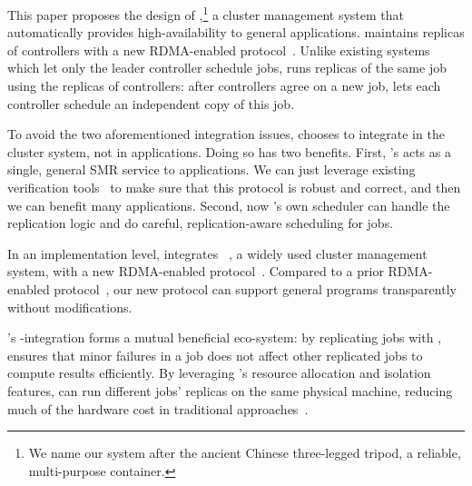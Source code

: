 
This paper proposes the design of \xxx,\footnote{We name our system after the 
ancient Chinese three-legged tripod, a reliable, multi-purpose container.} a 
cluster management system that automatically provides high-availability to 
general applications. \xxx maintains replicas of controllers with a new 
RDMA-enabled \paxos protocol~\cite{falcon:github}. Unlike existing systems which 
let only the leader controller schedule jobs, \xxx runs replicas of the same job 
using the replicas of controllers: after controllers agree on a new job, \xxx 
lets each controller schedule an independent copy of this job.

To avoid the two aforementioned integration issues, \xxx chooses to integrate 
\paxos in the cluster system, not in applications. Doing so has two benefits. 
First, \xxx's \paxos acts as a single, general SMR service to applications. We 
can just leverage existing verification 
tools~\cite{modist:nsdi09,demeter:sosp11} to make sure that this \paxos 
protocol is robust and correct, and then we can benefit many applications. 
Second, now \xxx's own scheduler can handle the replication logic and do 
careful, replication-aware scheduling for jobs.


In an implementation level, \xxx integrates \mesos~\cite{mesos:nsdi11}, a widely 
used cluster management system, with a new RDMA-enabled \paxos 
protocol~\cite{falcon:github}. Compared to a prior RDMA-enabled \paxos 
protocol~\cite{dare:hpdc15}, our new protocol can support general programs 
transparently without modifications.

\xxx's \mesos-\paxos integration forms a mutual beneficial 
eco-system: by replicating jobs with \paxos, 
\xxx ensures that minor failures in a job does not affect other replicated 
jobs to compute results efficiently. By leveraging \mesos's resource allocation 
and isolation features, \xxx can run different jobs' replicas on the same 
physical machine, reducing much of the hardware cost in traditional 
\paxos approaches~\cite{crane:sosp15,rex:eurosys14}.

